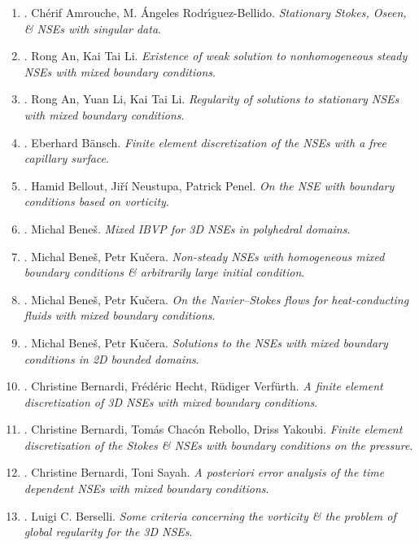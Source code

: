 \documentclass{article}
\begin{document}
\begin{enumerate}
	\item \cite{Amrouche_Rodriguez-Bellido2011}. {\sc Ch\'{e}rif Amrouche, M. \'{A}ngeles Rodr\'{\i}guez-Bellido}. {\it Stationary Stokes, Oseen, \& NSEs with singular data}.
	\item \cite{An_Li2009}. {\sc Rong An, Kai Tai Li}. {\it Existence of weak solution to nonhomogeneous steady NSEs with mixed boundary conditions}.
	\item \cite{An_Li_Li2009}. {\sc Rong An, Yuan Li, Kai Tai Li}. {\it Regularity of solutions to stationary NSEs with mixed boundary conditions}.
	\item \cite{Bansch2001}. {\sc Eberhard B\"{a}nsch}. {\it Finite element discretization of the NSEs with a free capillary surface}.
	\item \cite{Bellout_Neustupa_Penel2004}. {\sc Hamid Bellout, Ji\v{r}\'i Neustupa, Patrick Penel}. {\it On the NSE with boundary conditions based on vorticity}.
	\item \cite{Benes2011}. {\sc Michal Bene\v{s}}. {\it Mixed IBVP for 3D NSEs in polyhedral domains}.
	\item \cite{Benes_Kucera2007}. {\sc Michal Bene\v{s}, Petr Ku\v{c}era}. {\it Non-steady NSEs with homogeneous mixed boundary conditions \& arbitrarily large initial condition}.
	\item \cite{Benes_Kucera2012}. {\sc Michal Bene\v{s}, Petr Ku\v{c}era}. {\it On the Navier--Stokes flows for heat-conducting fluids with mixed boundary conditions}.
	\item \cite{Benes_Kucera2016}. {\sc Michal Bene\v{s}, Petr Ku\v{c}era}. {\it Solutions to the NSEs with mixed boundary conditions in 2D bounded domains}.	
	\item \cite{Bernardi_Hecht_Verfurth2009}. {\sc Christine Bernardi, Fr\'{e}d\'{e}ric Hecht, R\"{u}diger Verf\"{u}rth}. {\it A finite element discretization of 3D NSEs with mixed boundary conditions}.
	\item \cite{Bernardi_Rebollo_Yakoubi2015}. {\sc Christine Bernardi, Tom\'{a}s Chac\'{o}n Rebollo, Driss Yakoubi}. {\it Finite element discretization of the Stokes \& NSEs with boundary conditions on the pressure}.
	\item \cite{Bernardi_Rebollo_Yakoubi2015}. {\sc Christine Bernardi, Toni Sayah}. {\it A posteriori error analysis of the time dependent NSEs with mixed boundary conditions}.
	\item \cite{Berselli2009}. {\sc Luigi C. Berselli}. {\it Some criteria concerning the vorticity \& the problem of global regularity for the 3D NSEs}.

\end{enumerate}
\end{document}
